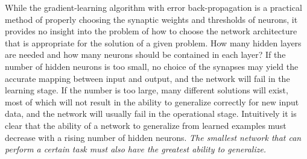 While the gradient-learning algorithm with error back-propagation is a practical method of properly choosing the synaptic weights and thresholds of neurons, it provides no insight into the problem of how to choose the network architecture that is appropriate for the solution of a given problem. How many hidden layers are needed and how many neurons should be contained in each layer? If the number of hidden neurons is too small, no choice of the synapses may yield the accurate mapping between input and output, and the network will fail in the learning stage. If the number is too large, many different solutions will exist, most of which will not result in the ability to generalize correctly for new input data, and the network will usually fail in the operational stage. Intuitively it is clear that the ability of a network to generalize from learned examples must decrease with a rising number of hidden neurons. \emph{The smallest network that can perform a certain task must also have the greatest ability to generalize.}


